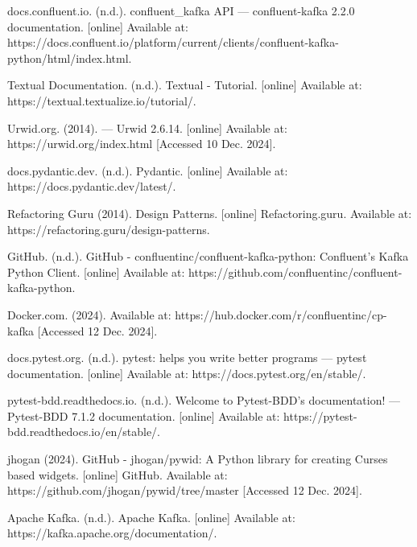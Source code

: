 \documentclass[10pt , a4paper]{report}
\begin{document}
\renewcommand{\bibname}{References}
\begin{thebibliography}{00}
 docs.confluent.io. (n.d.). confluent\_kafka API — confluent-kafka 2.2.0 documentation. [online] Available at: https://docs.confluent.io/platform/current/clients/confluent-kafka-python/html/index.html.

 Textual Documentation. (n.d.). Textual - Tutorial. [online] Available at: https://textual.textualize.io/tutorial/.

 Urwid.org. (2014). — Urwid 2.6.14. [online] Available at: https://urwid.org/index.html [Accessed 10 Dec. 2024].

 docs.pydantic.dev. (n.d.). Pydantic. [online] Available at: https://docs.pydantic.dev/latest/.

 Refactoring Guru (2014). Design Patterns. [online] Refactoring.guru. Available at: https://refactoring.guru/design-patterns.

 GitHub. (n.d.). GitHub - confluentinc/confluent-kafka-python: Confluent’s Kafka Python Client. [online] Available at: https://github.com/confluentinc/confluent-kafka-python.


 Docker.com. (2024). Available at: https://hub.docker.com/r/confluentinc/cp-kafka [Accessed 12 Dec. 2024].

 docs.pytest.org. (n.d.). pytest: helps you write better programs — pytest documentation. [online] Available at: https://docs.pytest.org/en/stable/.

 pytest-bdd.readthedocs.io. (n.d.). Welcome to Pytest-BDD’s documentation! — Pytest-BDD 7.1.2 documentation. [online] Available at: https://pytest-bdd.readthedocs.io/en/stable/.

 jhogan (2024). GitHub - jhogan/pywid: A Python library for creating Curses based widgets. [online] GitHub. Available at: https://github.com/jhogan/pywid/tree/master [Accessed 12 Dec. 2024].

 Apache Kafka. (n.d.). Apache Kafka. [online] Available at: https://kafka.apache.org/documentation/.


\end{thebibliography}
\end{document}
